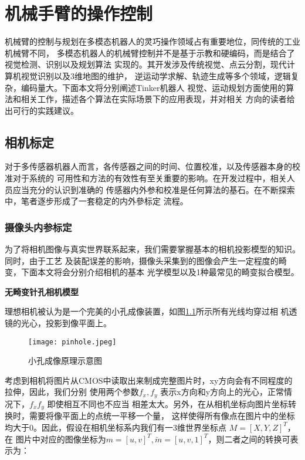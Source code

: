 \chapter{机械手臂的操作控制}
\label{cha:arm}

机械臂的控制与规划在多模态机器人的灵巧操作领域占有重要地位，同传统的工业机械臂不同，
多模态机器人的机械臂控制并不是基于示教和硬编码，而是结合了视觉检测、识别以及规划算法
实现的。其开发涉及传统视觉、点云分割，现代计算机视觉识别以及3维地图的维护，
逆运动学求解、轨迹生成等多个领域，逻辑复杂，编码量大。下面本文将分别阐述Tinker机器人
视觉、运动规划方面使用的算法和相关工作，描述各个算法在实际场景下的应用表现，并对相关
方向的读者给出可行的实践建议。

\section{相机标定}

对于多传感器机器人而言，各传感器之间的时间、位置校准，以及传感器本身的校准对于系统的
可用性和方法的有效性有至关重要的影响。在开发过程中，相关人员应当充分的认识到准确的
传感器内外参和校准是任何算法的基石。在不断探索中，笔者逐步形成了一套稳定的内外參标定
流程。

\subsection{摄像头内参标定}
\label{subsec:cam_intrinsic}

为了将相机图像与真实世界联系起来，我们需要掌握基本的相机投影模型的知识。同时，由于工艺
及装配误差的影响，摄像头采集到的图像会产生一定程度的畸变，下面本文将会分别介绍相机的基本
光学模型以及1种最常见的畸变拟合模型。

\noindent \textbf{无畸变针孔相机模型}

理想相机被认为是一个完美的小孔成像装置，如图\ref{fig:pinhole}所示所有光线均穿过相
机透镜的光心，投影到像平面上。

\begin{figure}[h] %
  \centering
  \texttt{[image: pinhole.jpeg]}
  \caption{小孔成像原理示意图}
  \label{fig:pinhole}
\end{figure}

考虑到相机将图片从CMOS中读取出来制成完整图片时，xy方向会有不同程度的拉伸，因此，我们分别
使用两个参数$f_x, f_y$ 表示x方向和y方向上的光心，正常情况下，$f_x f_y$ 即使相互不同也不应当
相差太大。另外，在从相机坐标向图片坐标转换时，需要将像平面上的点统一平移一个量，
这样使得所有像点在图片中的坐标均大于0。因此，假设在相机坐标系内我们有一3维世界坐标点
$M = [X, Y, Z]^T$，在
图片中对应的图像坐标为$m = [u, v]^T, \breve{m} = [u, v, 1]^T$，则二者之间的转换可表示为：

